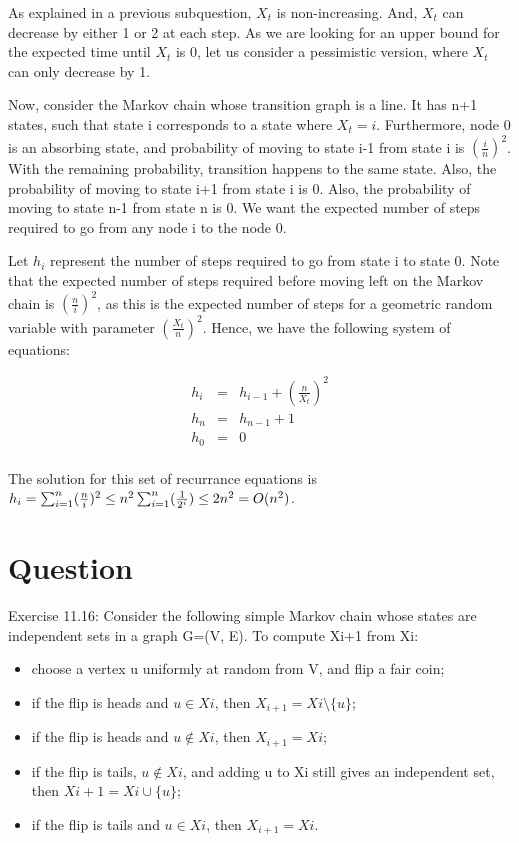\documentclass[10pt]{amsart}
\theoremstyle{remark}
\begin{document}
As explained in a previous subquestion, $X_{t}$ is non-increasing. And, $X_{t}$ can decrease by either 1 or 2 at each step. As we are looking for an upper bound for the expected time until $X_{t}$ is 0, let us consider a pessimistic version, where $X_{t}$ can only decrease by 1.

Now, consider the Markov chain whose transition graph is a line. It has n+1 states, such that state i corresponds to a state where $X_{t}=i$. Furthermore, node 0 is an absorbing state, and probability of moving to state i-1 from state i is $(\frac{i}{n})^{2}$. With the remaining probability, transition happens to the same state. Also, the probability of moving to state i+1 from state i is 0. Also, the probability of moving to state n-1 from state n is 0. We want the expected number of steps required to go from any node i to the node 0.

Let $h_{i}$ represent the number of steps required to go from state i to state 0. Note that the expected number of steps required before moving left on the Markov chain is $(\frac{n}{i})^{2}$, as this is the expected number of steps for a geometric random variable with parameter $(\frac{X_{t}}{n})^{2}$. Hence, we have the following system of equations:

\begin{eqnarray}
h_{i} &=& h_{i-1} + (\frac{n}{X_{t}})^{2}\\
h_{n} &=& h_{n-1} + 1 \\
h_{0} &=& 0\\
\end{eqnarray}

The solution for this set of recurrance equations is $h_{i}= \sum_{i=1}^{n} (\frac{n}{i})^{2} \\
\leq n^{2} \sum_{i=1}^{n} (\frac{1}{2^{i}}) \leq 2n^{2}= O(n^{2})$.

\section{Question}
Exercise 11.16: Consider the following simple Markov chain whose states are independent sets in a graph G=(V, E). To compute Xi+1 from Xi:

\begin{itemize}
\item choose a vertex u uniformly at random from V, and flip a fair coin;
\item if the flip is heads and $u \in Xi$, then $X_{i+1}=Xi \setminus \{u\}$;
\item if the flip is heads and $u \notin Xi$, then $X_{i+1}=Xi$;
\item if the flip is tails, $u \notin Xi$, and adding u to Xi still gives an independent set, then $Xi+1=Xi\cup\{u\}$;
\item if the flip is tails and $u\in Xi$, then $X_{i+1}=Xi$.
\end{itemize}
\end{document}
